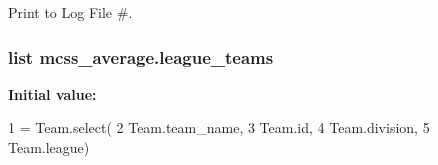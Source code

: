 Print to Log File \#. 

\subsubsection[{\texorpdfstring{league\+\_\+teams}{league_teams}}]{\setlength{\rightskip}{0pt plus 5cm}list mcss\+\_\+average.\+league\+\_\+teams}\hypertarget{namespacemcss__average_a8e4d9df3ff28d04b5c35ec9c051bef0f}{}\label{namespacemcss__average_a8e4d9df3ff28d04b5c35ec9c051bef0f}
{\bfseries Initial value\+:}
\begin{DoxyCode}
1 = Team.select(
2         Team.team\_name,
3         Team.id,
4         Team.division,
5         Team.league)
\end{DoxyCode}
